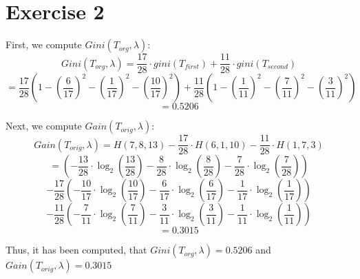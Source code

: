 \documentclass{report}
\begin{document}
\section*{Exercise 2}
First, we compute $Gini(T_{org}, \lambda)$:
$$Gini(T_{org}, \lambda) = \frac{17}{28} \cdot gini(T_{first}) + \frac{11}{28} \cdot gini(T_{second})$$
$$= \frac{17}{28} \left(1 - \left(\frac{6}{17}\right)^2 - \left( \frac{1}{17} \right)^2 - \left( \frac{10}{17} \right)^2 \right) + \frac{11}{28} \left(1 - \left( \frac{1}{11} \right)^2 - \left( \frac{7}{11} \right)^2 - \left( \frac{3}{11} \right)^2 \right)$$
$$ = 0.5206$$

Next, we compute $Gain(T_{orig}, \lambda)$:
$$Gain(T_{orig}, \lambda) = H(7, 8, 13) - \frac{17}{28} \cdot H(6, 1, 10) - \frac{11}{28} \cdot H(1, 7, 3)$$
$$ = \left(-\frac{13}{28} \cdot \log_2 \left(\frac{13}{28} \right) - \frac{8}{28} \cdot \log_2 \left( \frac{8}{28} \right) - \frac{7}{28} \cdot \log_2 \left( \frac{7}{28} \right) \right)$$
$$ - \frac{17}{28} \left( - \frac{10}{17} \cdot \log_2 \left( \frac{10}{17} \right) - \frac{6}{17} \cdot \log_2 \left( \frac{6}{17} \right) - \frac{1}{17} \cdot \log_2 \left( \frac{1}{17} \right) \right)$$
$$ - \frac{11}{28} \left( - \frac{7}{11} \cdot \log_2 \left( \frac{7}{11} \right) - \frac{3}{11} \cdot \log_2 \left( \frac{3}{11} \right) - \frac{1}{11} \cdot \log_2 \left( \frac{1}{11} \right) \right)$$
$$= 0.3015$$

Thus, it has been computed, that $Gini(T_{org}, \lambda) = 0.5206$ and $Gain(T_{orig}, \lambda) = 0.3015$
\end{document}
